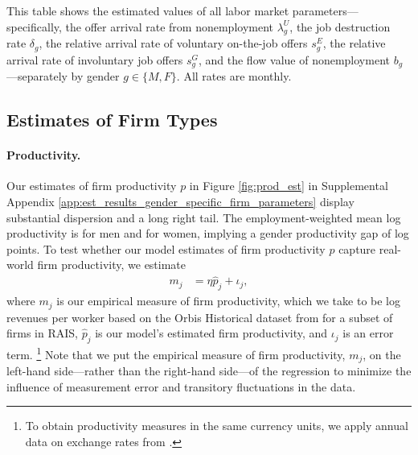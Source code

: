 %
\begin{table}[htbp!]
    \caption{Job offer arrival rates, job destruction rates, and flow values of nonemployment}
    \label{tab:labor_market_obj}
    \resizebox{\textwidth}{!}{%
    
    }
    \begin{tablenotes}
        \footnotesize
        This table shows the estimated values of all labor market parameters---specifically, the offer arrival rate from nonemployment $\lambda_{g}^{U}$, the job destruction rate $\delta_{g}$, the relative arrival rate of voluntary on-the-job offers $s_{g}^{E}$, the relative arrival rate of involuntary job offers $s_{g}^{G}$, and the flow value of nonemployment $b_{g}$---separately by gender $g \in \{ M, F \}$. All rates are monthly. %
    \end{tablenotes}
    \begin{tablenotes}[Source]
        \sourcemodel%
    \end{tablenotes}
\end{table}
%


\subsection{Estimates of Firm Types\label{subsec:estimation_distributions}}


\paragraph{Productivity.}

Our estimates of firm productivity $p$ in Figure \ref{fig:prod_est} in Supplemental Appendix \ref{app:est_results_gender_specific_firm_parameters} display substantial dispersion and a long right tail. The employment-weighted mean log productivity is  for men and  for women, implying a gender productivity gap of  log points.
%
To test whether our model estimates of firm productivity $p$ capture real-world firm productivity, we estimate
%
\begin{align}
    m_{j} &= \eta \widehat{p}_{j} + \iota_{j}, \label{eq:second_stage_productivity}
\end{align}
%
where $m_{j}$ is our empirical measure of firm productivity, which we take to be log revenues per worker based on the Orbis Historical dataset from \citet{Moodys2025} for a subset of firms in RAIS, $\widehat{p}_{j}$ is our model's estimated firm productivity, and $\iota_{j}$ is an error term.%
%
\footnote{To obtain productivity measures in the same currency units, we apply annual data on exchange rates from \citet{IMF2022}.} %
%
Note that we put the empirical measure of firm productivity, $m_{j}$, on the left-hand side---rather than the right-hand side---of the regression to minimize the influence of measurement error and transitory fluctuations in the data.


